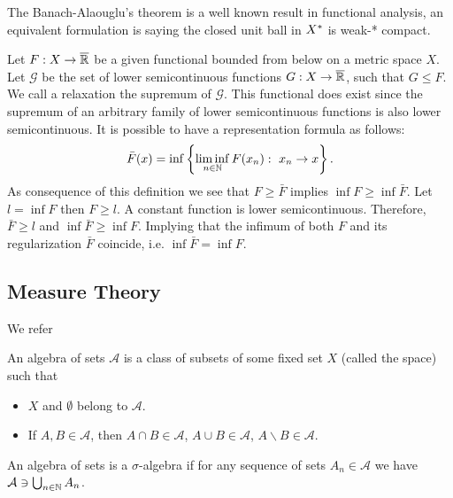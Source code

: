 The Banach-Alaouglu's theorem is a well known result in functional analysis, an equivalent formulation is saying the closed unit ball in ${X}^*$ is weak-* compact.

\begin{definition}
	Let $F:X\rightarrow \overline{\mathbb{R}}$ be a given functional bounded from below on a metric space $X$.  Let $\mathcal G$ be the set of lower semicontinuous functions $G: X\rightarrow \overline{\mathbb{R}}$, such that $G\leq F$. We call a relaxation the supremum of $\mathcal G$.  This functional does exist since the supremum of an arbitrary family of lower semicontinuous functions is also lower semicontinuous. It is possible to have a representation formula as follows:
	\begin{equation}
	\bar F(x) = \inf \left\lbrace \liminf_{n\in \mathbb{N}} F(x_n):\ x_n\rightarrow x \right\rbrace.
	\end{equation}
	As consequence of this definition we see that $F \geq \bar F$ implies $\inf F \geq \inf \bar F$. Let $l=\inf F$ then $F\geq l$. A constant function is lower semicontinuous. Therefore, $\bar F \geq l$ and $\inf \bar F \geq \inf F$. Implying that the infimum of both $F$ and its regularization $\bar F$ coincide, i.e. $\inf \bar F = \inf F$. 
\end{definition}


\subsection{Measure Theory}

We refer \cite{bogachev2007Measure}
\begin{definition}
	
	An algebra of sets $\mathcal{A}$ is a class of subsets of some fixed set $X$ (called the space) such that
	
	\begin{itemize}
		\item $X$ and $\emptyset$ belong to $\mathcal{A}$.
		\item If $A, B \in \mathcal{A}$, then $A\cap B \in \mathcal{A}$, $A\cup B \in \mathcal A$, $A\backslash B \in \mathcal A$.
	\end{itemize}
	
	An algebra of sets is a $\sigma$-algebra if for any sequence of sets $A_n \in \mathcal A$ we have $\mathcal{A}\ni \bigcup_{n\in \mathbb{N}}  A_n $.
\end{definition}

